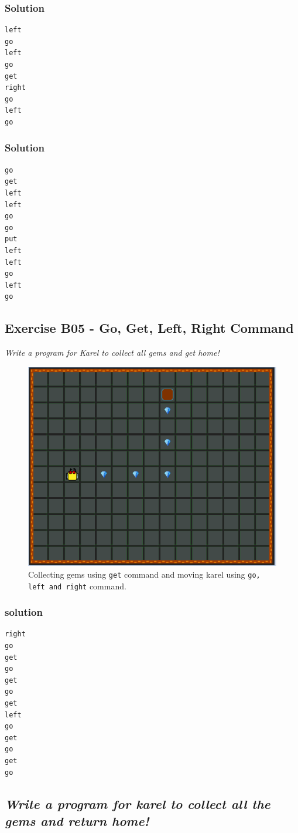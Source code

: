 \documentclass[article,A4,12pt]{llncs}
\begin{document}
{{\subsubsection{Solution}
\begin{verbatim}
left
go
left
go
get
right
go
left
go
\end{verbatim}

\newpage

\subsubsection{Solution}
\begin{verbatim}
go
get
left
left
go
go
put
left
left
go
left 
go
\end{verbatim}

\subsection{Exercise B05 - Go, Get, Left, Right Command}

{\em Write a program for Karel to collect all gems and get home!}
\begin{figure}[!ht]
\begin{center}
\includegraphics[height=0.4\textwidth]{imgk/a18.png}
\end{center}
\vspace{-4mm}
\caption{Collecting gems using {\tt get} command and moving karel using {\tt go, left and right} command.}
\label{fig:b05}
\vspace{-4mm}
\end{figure}
\noindent
\subsubsection{solution}
\begin{verbatim}
right
go
get
go
get
go
get
left
go
get
go
get
go
\end{verbatim}

\subsection
{\em Write a program for karel to collect all the gems and return home!}

}}
\end{document}
